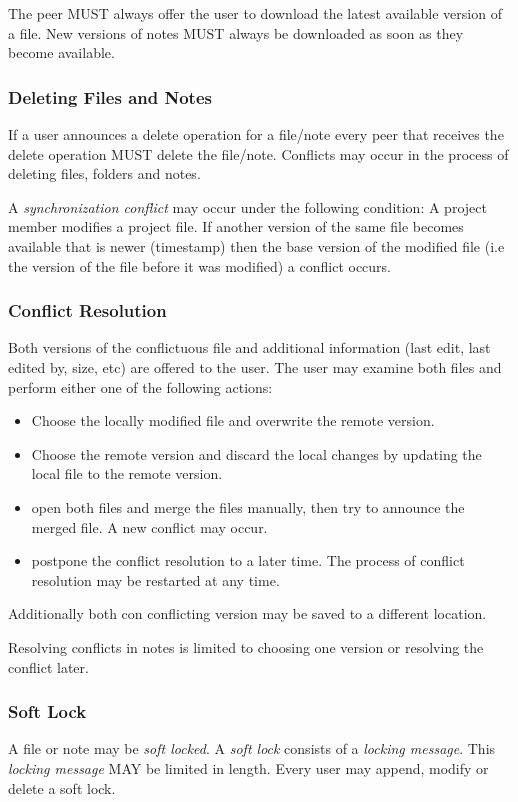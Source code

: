 The peer MUST always offer the user to download the latest available version of a file. New versions of notes MUST always be downloaded as soon as they become available.

\subsubsection{Deleting Files and Notes}
If a user announces a delete operation for a file/note every peer that receives the delete operation MUST delete the file/note. Conflicts may occur in the process of deleting files, folders and notes.

A \emph{synchronization conflict} may occur under the following condition: A project member modifies a project file. If another version of the same file becomes available that is newer (timestamp) then the base version of the modified file (i.e the version of the file before it was modified) a conflict occurs.

\subsubsection{Conflict Resolution}
Both versions of the conflictuous file and additional information (last edit, last edited by, size, etc) are offered to the user. The user may examine both files and perform either one of the following actions:
\begin{itemize}
\item Choose the locally modified file and overwrite the remote version.
\item Choose the remote version and discard the local changes by updating the local file to the remote version.
\item open both files and merge the files manually, then try to announce the merged file. A new conflict may occur.
\item postpone the conflict resolution to a later time. The process of conflict resolution may be restarted at any time.
\end{itemize}
Additionally both con conflicting version may be saved to a different location.

Resolving conflicts in notes is limited to choosing one version or resolving the conflict later.

\subsubsection{Soft Lock}
A file or note may be \emph{soft locked}. A \emph{soft lock} consists of a \emph{locking message}. This \emph{locking message} MAY be limited in length. Every user may append, modify or delete a soft lock.

